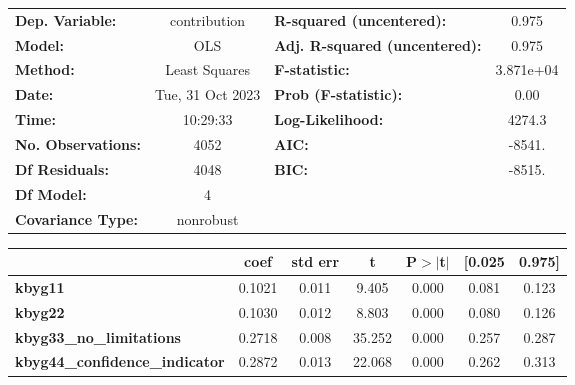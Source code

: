 \begin{center}
\begin{tabular}{lclc}
\toprule
\textbf{Dep. Variable:}                &   contribution   & \textbf{  R-squared (uncentered):}      &     0.975   \\
\textbf{Model:}                        &       OLS        & \textbf{  Adj. R-squared (uncentered):} &     0.975   \\
\textbf{Method:}                       &  Least Squares   & \textbf{  F-statistic:       }          & 3.871e+04   \\
\textbf{Date:}                         & Tue, 31 Oct 2023 & \textbf{  Prob (F-statistic):}          &     0.00    \\
\textbf{Time:}                         &     10:29:33     & \textbf{  Log-Likelihood:    }          &    4274.3   \\
\textbf{No. Observations:}             &        4052      & \textbf{  AIC:               }          &    -8541.   \\
\textbf{Df Residuals:}                 &        4048      & \textbf{  BIC:               }          &    -8515.   \\
\textbf{Df Model:}                     &           4      & \textbf{                     }          &             \\
\textbf{Covariance Type:}              &    nonrobust     & \textbf{                     }          &             \\
\bottomrule
\end{tabular}
\begin{tabular}{lcccccc}
                                       & \textbf{coef} & \textbf{std err} & \textbf{t} & \textbf{P$> |$t$|$} & \textbf{[0.025} & \textbf{0.975]}  \\
\midrule
\textbf{kbyg11}                        &       0.1021  &        0.011     &     9.405  &         0.000        &        0.081    &        0.123     \\
\textbf{kbyg22}                        &       0.1030  &        0.012     &     8.803  &         0.000        &        0.080    &        0.126     \\
\textbf{kbyg33\_no\_limitations}       &       0.2718  &        0.008     &    35.252  &         0.000        &        0.257    &        0.287     \\
\textbf{kbyg44\_confidence\_indicator} &       0.2872  &        0.013     &    22.068  &         0.000        &        0.262    &        0.313     \\

\end{tabular}
\end{center}
